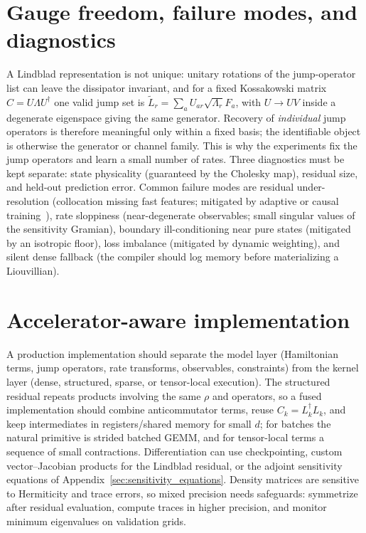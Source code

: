 \documentclass[twocolumn,aps,prxquantum,superscriptaddress,nofootinbib,floatfix,longbibliography]{revtex4-2}
\begin{document}
\section{Gauge freedom, failure modes, and diagnostics}
\label{sec:gauge_failure_modes}
A Lindblad representation is not unique: unitary rotations of the jump-operator list can leave the dissipator invariant, and for a fixed Kossakowski matrix $C=U\Lambda U^\dagger$ one valid jump set is $\widetilde L_r=\sum_a U_{ar}\sqrt{\Lambda_r}F_a$, with $U\to UV$ inside a degenerate eigenspace giving the same generator. Recovery of \emph{individual} jump operators is therefore meaningful only within a fixed basis; the identifiable object is otherwise the generator or channel family. This is why the experiments fix the jump operators and learn a small number of rates. Three diagnostics must be kept separate: state physicality (guaranteed by the Cholesky map), residual size, and held-out prediction error. Common failure modes are residual under-resolution (collocation missing fast features; mitigated by adaptive or causal training~\cite{wang2022respecting}), rate sloppiness (near-degenerate observables; small singular values of the sensitivity Gramian), boundary ill-conditioning near pure states (mitigated by an isotropic floor), loss imbalance (mitigated by dynamic weighting), and silent dense fallback (the compiler should log memory before materializing a Liouvillian).

\section{Accelerator-aware implementation}
\label{sec:accelerator_roadmap}
A production implementation should separate the model layer (Hamiltonian terms, jump operators, rate transforms, observables, constraints) from the kernel layer (dense, structured, sparse, or tensor-local execution). The structured residual repeats products involving the same $\rho$ and operators, so a fused implementation should combine anticommutator terms, reuse $C_k=L_k^\dagger L_k$, and keep intermediates in registers/shared memory for small $d$; for batches the natural primitive is strided batched GEMM, and for tensor-local terms a sequence of small contractions. Differentiation can use checkpointing, custom vector--Jacobian products for the Lindblad residual, or the adjoint sensitivity equations of Appendix~\ref{sec:sensitivity_equations}. Density matrices are sensitive to Hermiticity and trace errors, so mixed precision needs safeguards: symmetrize after residual evaluation, compute traces in higher precision, and monitor minimum eigenvalues on validation grids.
\end{document}
